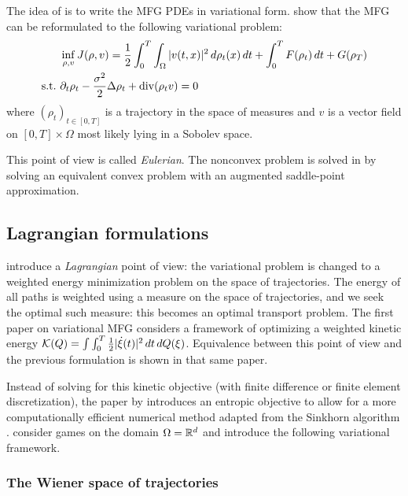 \documentclass[../report.tex]{subfiles}
\begin{document}
The idea of \cite{benamou:hal-01295299} is to write the MFG PDEs in variational form.
\textcite{benamou:hal-01295299} show that the MFG can be reformulated to the following variational problem:
\begin{equation}\label{eq:EulerianProblem}
\begin{aligned}
&\inf_{\rho,v} J(\rho, v) =
\frac{1}{2}\int_0^T\int_\Omega |v(t,x)|^2 \,d\rho_t(x)\,dt + \int_0^T F(\rho_t)\,dt + G(\rho_T)
\\
\mathrm{s.t.}\ &\partial_t \rho_t - \frac{\sigma^2}{2}\Delta \rho_t + \operatorname{div}(\rho_t v) = 0
\end{aligned}
\end{equation}
where $(\rho_t)_{t\in[0,T]}$ is a trajectory in the space of measures and $v$ is a vector field on $[0,T] \times \Omega$ most likely lying in a Sobolev space.

This point of view is called \textit{Eulerian}. The nonconvex problem is solved in \textcite{benamou:hal-01295299,benamou2015lagrangian} by solving an equivalent convex problem with an augmented saddle-point approximation.


\subsection{Lagrangian formulations}

\textcite{benamou:hal-01295299,benamou2018entropy} introduce a \textit{Lagrangian} point of view: the variational problem is changed to a weighted energy minimization problem on the space of trajectories. The energy of all paths is weighted using a measure on the space of trajectories, and we seek the optimal such measure: this becomes an optimal transport problem. The first paper \cite{benamou:hal-01295299} on variational MFG considers a framework of optimizing a weighted kinetic energy $\mathcal{K}(Q) = \int \int_0^T \frac{1}{2}|\dot\xi(t)|^2\,dt\,dQ(\xi)$. Equivalence between this point of view and the previous formulation is shown in that same paper.

Instead of solving for this kinetic objective (with finite difference or finite element discretization), the paper by \textcite{benamou2018entropy} introduces an entropic objective to allow for a more computationally efficient numerical method adapted from the Sinkhorn algorithm \cite{cuturi2013sinkhorn}. \citeauthor{benamou2018entropy} consider games on the domain $\Omega = \mathbb{R}^d$ and introduce the following variational framework.


\subsubsection{The Wiener space of trajectories}
\end{document}
